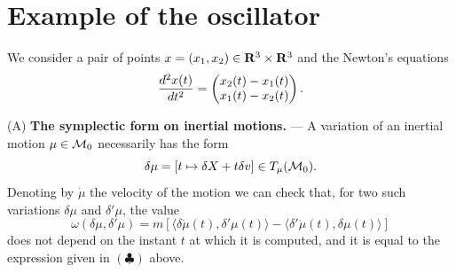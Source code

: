 \section{Example of the oscillator}

We consider a pair of points $x = (x_1,x_2) \in \mathbf{R}^3 \times \mathbf{R}^3$ and the
Newton's equations
$$
  {d^2 x(t) \over dt^2} = \begin{pmatrix} x_2(t) - x_1(t) \\ x_1(t) - x_2(t) \end{pmatrix}.
$$

(A) {\bf The symplectic form on inertial motions.} ---
A variation of an inertial motion $\mu \in \mathcal{M}_0$ necessarily has the form
$$
  \delta \mu = [t \mapsto \delta X + t \delta v] \in T_\mu(\mathcal{M}_0).
$$
Denoting by $\dot \mu$ the velocity
of the motion we can check that, for two such variations $\delta \mu$ and
$\delta' \mu$, the value
\renewcommand{\theequation}{$\spadesuit$}
\begin{equation}
  \omega(\delta\mu,\delta'\mu) = m\left[\langle \delta \dot \mu(t),\delta'\mu(t)\rangle -
  \langle \delta'\dot\mu(t),\delta \mu(t)\rangle\right]
\end{equation}
does not depend on the instant $t$ at which it is computed, and it is equal to the
expression given in $(\clubsuit)$ above.

